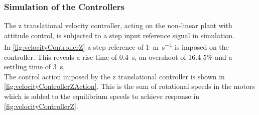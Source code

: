\subsubsection{Simulation of the Controllers}
The z translational velocity controller, acting on the non-linear plant with attitude control, is subjected to a step input reference signal in simulation.\\
In \autoref{fig:velocityControllerZ} a step reference of \SI{1}{m s^{-1}} is imposed on the controller. This reveals a rise time of \SI{0.4}{s}, an overshoot of 16.4 $5 \%$ and a settling time of \SI{3}{s}.\\
The control action imposed by the z translational controller is shown in \autoref{fig:velocityControllerZAction}. This is the sum of rotational speeds in the motors which is added to the equilibrium speeds to achieve response in \autoref{fig:velocityControllerZ}.

